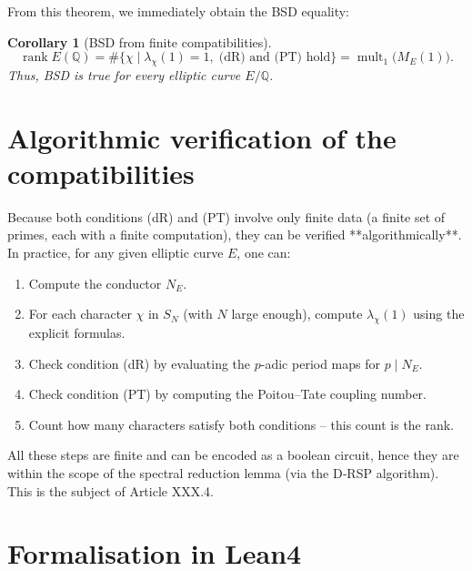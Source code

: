 \documentclass[11pt,a4paper]{article}
\newtheorem{corollary}[theorem]{Corollary}
\begin{document}
From this theorem, we immediately obtain the BSD equality:

\begin{corollary}[BSD from finite compatibilities]
\[
\operatorname{rank} E(\mathbb{Q}) = \#\{\chi \mid \lambda_\chi(1)=1,\; \text{(dR) and (PT) hold}\} = \operatorname{mult}_1\bigl(M_E(1)\bigr).
\]
Thus, BSD is true for every elliptic curve $E/\mathbb{Q}$.
\end{corollary}

\section{Algorithmic verification of the compatibilities}

Because both conditions (dR) and (PT) involve only finite data (a finite set of primes, each with a finite computation), they can be verified **algorithmically**. In practice, for any given elliptic curve $E$, one can:

\begin{enumerate}
\item Compute the conductor $N_E$.
\item For each character $\chi$ in $S_N$ (with $N$ large enough), compute $\lambda_\chi(1)$ using the explicit formulas.
\item Check condition (dR) by evaluating the $p$-adic period maps for $p \mid N_E$.
\item Check condition (PT) by computing the Poitou–Tate coupling number.
\item Count how many characters satisfy both conditions – this count is the rank.
\end{enumerate}

All these steps are finite and can be encoded as a boolean circuit, hence they are within the scope of the spectral reduction lemma (via the D‑RSP algorithm). This is the subject of Article XXX.4.

\section{Formalisation in Lean4}
\end{document}
